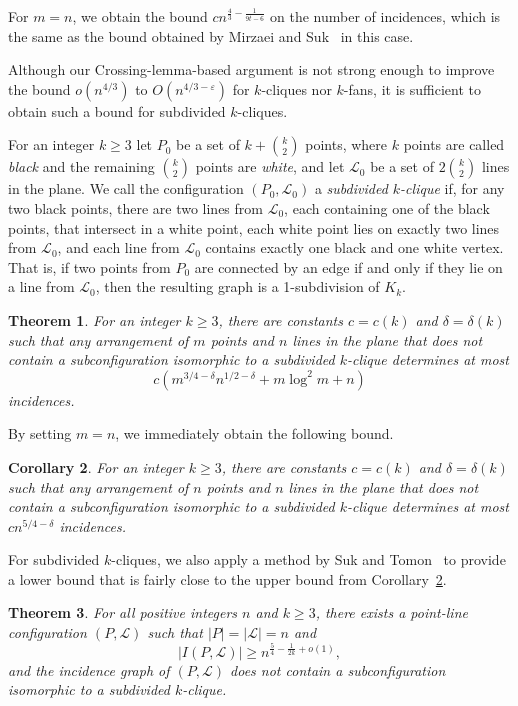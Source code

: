 \documentclass{article}
\newtheorem{theorem}{Theorem}
\newtheorem{corollary}[theorem]{Corollary}
\begin{document}
For $m=n$, we obtain the bound $c n^{\frac{4}{3}-\frac{1}{9t-6}}$ on the number of incidences, which is the same as the bound obtained by Mirzaei and Suk~\cite{mirSuk21} in this case. 

Although our Crossing-lemma-based argument is not strong enough to improve the bound $o(n^{4/3})$ to $O(n^{4/3-\varepsilon})$ for $k$-cliques nor $k$-fans, it is sufficient to obtain such a bound for subdivided $k$-cliques.

For an integer $k \geq 3$ let $P_0$ be a set of $k+\binom{k}{2}$ points, where $k$ points are called \emph{black} and the remaining $\binom{k}{2}$ points are \emph{white}, and let $\mathcal{L}_0$ be a set of $2\binom{k}{2}$ lines in the plane.
We call the configuration $(P_0,\mathcal{L}_0)$ a \emph{subdivided $k$-clique} if, for any two black points, there are two lines from $\mathcal{L}_0$, each containing one of the black points, that intersect in a white point, each white point lies on exactly two lines from $\mathcal{L}_0$, and each line from $\mathcal{L}_0$ contains exactly one black and one white vertex.
That is, if two points from $P_0$ are connected by an edge if and only if they lie on a line from $\mathcal{L}_0$, then the resulting graph is a 1-subdivision of $K_k$.

\begin{theorem}
\label{thm-subdivision}
For an integer $k \geq 3$, there are constants $c=c(k)$ and $\delta=\delta(k)$ such that any arrangement of $m$ points and $n$ lines in the plane that does not contain a subconfiguration isomorphic to a subdivided $k$-clique determines at most 
\[c(m^{3/4-\delta}n^{1/2-\delta}+m\log^2{m}+n)\] 
incidences. 
\end{theorem}

By setting $m=n$, we immediately obtain the following bound.

\begin{corollary}
\label{cor-subdivision}
For an integer $k \geq 3$, there are constants $c=c(k)$ and $\delta=\delta(k)$ such that any arrangement of $n$ points and $n$ lines in the plane that does not contain a subconfiguration isomorphic to a subdivided $k$-clique determines at most $c n^{5/4-\delta}$ incidences. 
\end{corollary}

For subdivided $k$-cliques, we also apply a method by Suk and Tomon~\cite{tomSuk21} to provide a lower bound that is fairly close to the upper bound from Corollary~\ref{cor-subdivision}.

\begin{theorem}
\label{thm-lowerbound}
For all positive integers $n$ and $k \geq 3$, there exists a point-line configuration $(P,\mathcal{L})$ such that $|P|=|\mathcal{L}|=n$ and 
\[|I(P,\mathcal{L})|\geq n^{\frac{5}{4}-\frac{1}{2k}+o(1)},\] and the incidence graph of $(P,\mathcal{L})$ does not contain a subconfiguration isomorphic to a subdivided $k$-clique.
\end{theorem}
\end{document}
